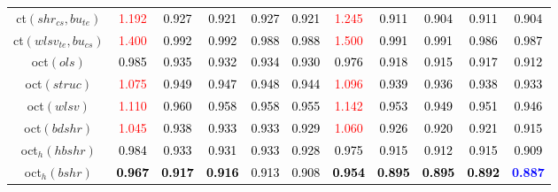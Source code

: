 \begin{tabular}[t]{c|>{}cccc>{}c|ccccc}
ct$(shr_{cs}, bu_{te})$ & \textcolor{red}{1.192} & \textcolor{black}{0.927} & \textcolor{black}{0.921} & \textcolor{black}{0.927} & \textcolor{black}{0.921} & \textcolor{red}{1.245} & \textcolor{black}{0.911} & \textcolor{black}{0.904} & \textcolor{black}{0.911} & \textcolor{black}{0.904}\\
ct$(wlsv_{te}, bu_{cs})$ & \textcolor{red}{1.400} & \textcolor{black}{0.992} & \textcolor{black}{0.992} & \textcolor{black}{0.988} & \textcolor{black}{0.988} & \textcolor{red}{1.500} & \textcolor{black}{0.991} & \textcolor{black}{0.991} & \textcolor{black}{0.986} & \textcolor{black}{0.987}\\
oct$(ols)$ & \textcolor{black}{0.985} & \textcolor{black}{0.935} & \textcolor{black}{0.932} & \textcolor{black}{0.934} & \textcolor{black}{0.930} & \textcolor{black}{0.976} & \textcolor{black}{0.918} & \textcolor{black}{0.915} & \textcolor{black}{0.917} & \textcolor{black}{0.912}\\
oct$(struc)$ & \textcolor{red}{1.075} & \textcolor{black}{0.949} & \textcolor{black}{0.947} & \textcolor{black}{0.948} & \textcolor{black}{0.944} & \textcolor{red}{1.096} & \textcolor{black}{0.939} & \textcolor{black}{0.936} & \textcolor{black}{0.938} & \textcolor{black}{0.933}\\
oct$(wlsv)$ & \textcolor{red}{1.110} & \textcolor{black}{0.960} & \textcolor{black}{0.958} & \textcolor{black}{0.958} & \textcolor{black}{0.955} & \textcolor{red}{1.142} & \textcolor{black}{0.953} & \textcolor{black}{0.949} & \textcolor{black}{0.951} & \textcolor{black}{0.946}\\
oct$(bdshr)$ & \textcolor{red}{1.045} & \textcolor{black}{0.938} & \textcolor{black}{0.933} & \textcolor{black}{0.933} & \textcolor{black}{0.929} & \textcolor{red}{1.060} & \textcolor{black}{0.926} & \textcolor{black}{0.920} & \textcolor{black}{0.921} & \textcolor{black}{0.915}\\
oct$_h(hbshr)$ & \textcolor{black}{0.984} & \textcolor{black}{0.933} & \textcolor{black}{0.931} & \textcolor{black}{0.933} & \textcolor{black}{0.928} & \textcolor{black}{0.975} & \textcolor{black}{0.915} & \textcolor{black}{0.912} & \textcolor{black}{0.915} & \textcolor{black}{0.909}\\
oct$_h(bshr)$ & \textcolor{black}{\textbf{0.967}} & \textcolor{black}{\textbf{0.917}} & \textcolor{black}{\textbf{0.916}} & \textcolor{black}{0.913} & \textcolor{black}{0.908} & \textcolor{black}{\textbf{0.954}} & \textcolor{black}{\textbf{0.895}} & \textcolor{black}{\textbf{0.895}} & \textcolor{black}{\textbf{0.892}} & \textcolor{blue}{\textbf{0.887}}\\

\end{tabular}
